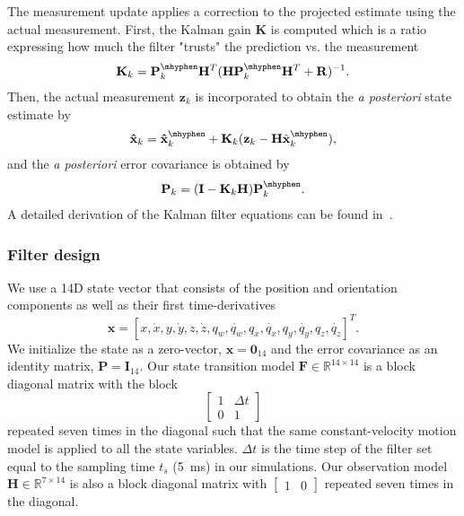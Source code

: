 \documentclass[sigconf]{acmart}			%
\newcommand{\matr}[1]{\mathrm{\mathbf{#1}}}
\begin{document}
The measurement update applies a correction to the projected estimate using the actual measurement.
First, the Kalman gain $\matr{K}$ is computed which is a ratio expressing how much the filter "trusts" the prediction vs. the measurement
\begin{align}
	\matr{K}_k = \matr{P}_{k}^\mhyphen \matr{H}^T(\matr{H}\matr{P}_{k}^\mhyphen \matr{H}^T+\matr{R})^{-1}.
\end{align}
Then, the actual measurement $\mathbf{z}_k$ is incorporated to obtain the \emph{a posteriori} state estimate by 
\begin{align}
	\mathbf{\hat{x}}_{k} = \mathbf{\hat{\mathbf{x}}}_{k}^\mhyphen + \matr{K}_k(\mathbf{z}_k-\matr{H}\hat{\mathbf{x}}_{k}^\mhyphen),
\end{align}
and the \emph{a posteriori} error covariance is obtained by
\begin{align}
	\matr{P}_{k} = (\matr{I}-\matr{K}_k\matr{H})\matr{P}_{k}^\mhyphen.
\end{align}
A detailed derivation of the Kalman filter equations can be found in~\cite{labbe2015}.

\subsubsection*{Filter design}
\label{sec:filter_design}
We use a 14D state vector that consists of the position and orientation components as well as their first time-derivatives
\begin{equation}
	\mathbf{x} = \left[x,\dot{x},y,\dot{y},z,\dot{z},q_w,\dot{q_w},q_x,\dot{q_x},q_y,\dot{q_y},q_z,\dot{q_z} \right]^T.
\end{equation}
We initialize the state as a zero-vector, $\mathbf{x}=\matr{0}_{14}$ and the error covariance as an identity matrix, $\matr{P}=\matr{I}_{14}$.
Our state transition model $\matr{F}\in\mathbb{R}^{14\times 14}$ is a block diagonal matrix with the block
$$
\begin{bmatrix}
	1 & \Delta t \\
	0 & 1
\end{bmatrix}
$$
repeated seven times in the diagonal such that the same constant-velocity motion model is applied to all the state variables. 
$\Delta t$ is the time step of the filter set equal to the sampling time $t_s$ (\SI{5}{ms}) in our simulations.
Our observation model $\matr{H}\in\mathbb{R}^{7\times 14}$ is also a block diagonal matrix with $
\begin{bmatrix}
	1 & 0 
\end{bmatrix}
$
repeated seven times in the diagonal.
\end{document}
